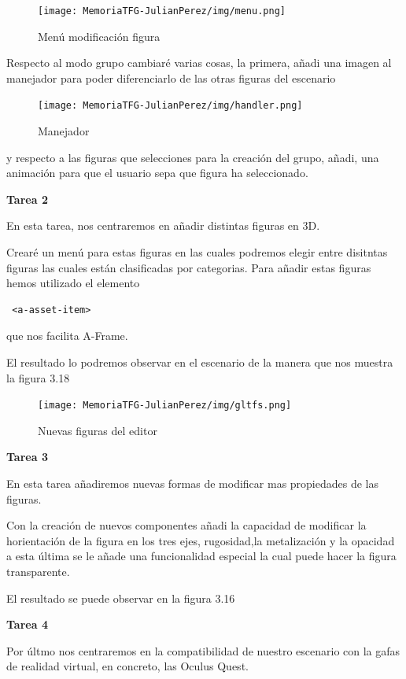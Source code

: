 \documentclass[a4paper, 12pt]{book}
\begin{document}
\begin{figure}[H]
  \centering
  \texttt{[image: MemoriaTFG-JulianPerez/img/menu.png]}
  \caption{Menú modificación figura}\label{scrum}
\end{figure}

Respecto al modo grupo cambiaré varias cosas, la primera, añadi una imagen al manejador para poder diferenciarlo de las otras figuras del escenario

\begin{figure}[H]
  \centering
  \texttt{[image: MemoriaTFG-JulianPerez/img/handler.png]}
  \caption{Manejador}\label{scrum}
\end{figure}

y respecto a las figuras que selecciones para la creación del grupo, añadi, una animación para que el usuario sepa que figura ha seleccionado.


\textbf{Tarea 2}

En esta tarea, nos centraremos en añadir distintas figuras en 3D.

Crearé un menú para estas figuras en las cuales podremos elegir entre disitntas figuras las cuales están clasificadas por categorias. Para añadir estas figuras hemos utilizado el elemento \begin{verbatim} <a-asset-item>\end{verbatim} que nos facilita A-Frame.

El resultado lo podremos observar en el escenario de la manera que nos muestra la figura 3.18

\begin{figure}[H]
  \centering
  \texttt{[image: MemoriaTFG-JulianPerez/img/gltfs.png]}
  \caption{Nuevas figuras del editor}\label{fig}
\end{figure}

\textbf{Tarea 3}

En esta tarea añadiremos nuevas formas de modificar mas propiedades de las figuras.

Con la creación de nuevos componentes añadi la capacidad de modificar la horientación de la figura en los tres ejes, rugosidad,la metalización y la opacidad a esta última se le añade una funcionalidad especial la cual puede hacer la figura transparente.

El resultado se puede observar en la figura 3.16

\textbf{Tarea 4}

Por últmo nos centraremos en la compatibilidad de nuestro escenario con la gafas de realidad virtual, en concreto, las Oculus Quest. 
\end{document}
